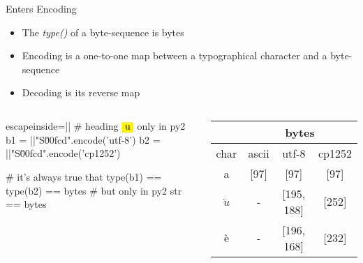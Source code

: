 \begin{frame}[fragile]{Enters Encoding}
\begin{itemize}
\item The \emph{type()} of a byte-sequence is bytes

\item Encoding is a one-to-one map between a typographical character and a byte-sequence 
\item Decoding is its reverse map
\end{itemize}

\begin{columns}
\begin{pythoncode*}{escapeinside=||}
# heading $\pyver{u}$ only in py2
b1 = ||"S\u00fcd".encode('utf-8') 
b2 = ||"S\u00fcd".encode('cp1252')

# it's always true that
type(b1) == type(b2) == bytes
# but only in py2
str == bytes





\end{pythoncode*}

\small
\begin{tabular}{|c||c|c|c|}\hline 
            & \multicolumn{3}{|c|}{bytes}  \\ \hline
char        & ascii     & utf-8         & cp1252     \\ \hline
a           & [97]      & [97]          & [97]      \\ \hline     
$\ddot{u}$  & -         & [195, 188]    & [252]              \\ \hline
\`{e}     &  - & [196, 168] & [232]\\ \hline
\end{tabular}
\end{columns}

\end{frame}


